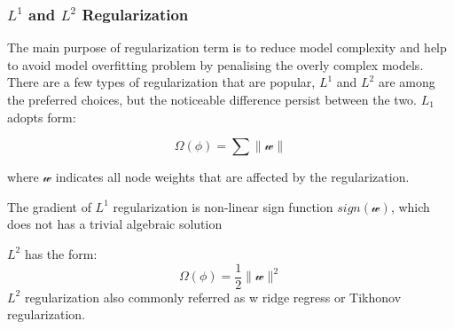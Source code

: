 \subsubsection{$L^1$ and $L^2$ Regularization}

The main purpose of regularization term is to reduce model complexity and help to avoid model overfitting problem by penalising the overly complex models. There are a few types of regularization that are popular, $L^1$ and $L^2$ are among the preferred choices, but the noticeable difference persist between the two. $L_1$ adopts form:

\begin{equation}
   \Omega(\phi) = \sum \parallel \mathcal{w} \parallel
\end{equation}

where $\mathcal{w}$ indicates all node weights that are affected by the regularization. 
\par 
The gradient of $L^1$ regularization is non-linear sign function $sign (\mathcal{w})$, which does not has a trivial algebraic solution

$L^2$ has the form:
\begin{equation}
   \Omega(\phi) = \frac {1}{2} \parallel \mathcal{w} \parallel^2
\end{equation}
$L^2$ regularization also commonly referred as w ridge regress or Tikhonov regularization. 